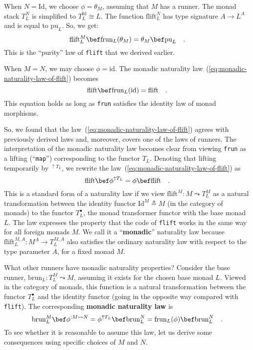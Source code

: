 When $N=\text{Id}$, we choose $\phi=\theta_{M}$, assuming that $M$
has a runner. The monad stack $T_{L}^{N}$ is simplified to $T_{L}^{\text{Id}}\cong L$.
The function $\text{flift}_{L}^{N}$ has type signature $A\rightarrow L^{A}$
and is equal to $\text{pu}_{L}$. So, we get:
\[
\text{flift}_{L}^{M}\bef\text{frun}_{L}(\theta_{M})=\theta_{M}\bef\text{pu}_{L}\quad.
\]
This is the \textsf{``}purity\textsf{''} law of \lstinline!flift! that we derived
earlier.

When $M=N$, we may choose $\phi=\text{id}$. The monadic naturality
law~(\ref{eq:monadic-naturality-law-of-flift}) becomes
\[
\text{flift}\bef\text{frun}_{L}(\text{id})=\text{flift}\quad.
\]
This equation holds as long as \lstinline!frun! satisfies the identity
law of monad morphisms.

So, we found that the law~(\ref{eq:monadic-naturality-law-of-flift})
agrees with previously derived laws and, moreover, covers one of the
laws of runners. The interpretation of the monadic naturality law
becomes clear from viewing \lstinline!frun! as a lifting (\textsf{``}\lstinline!map!\textsf{''})
corresponding to the functor $T_{L}$. Denoting that lifting temporarily
by $^{\uparrow T_{L}}$, we rewrite the law~(\ref{eq:monadic-naturality-law-of-flift})
as
\[
\text{flift}\bef\phi^{\uparrow T_{L}}=\phi\bef\text{flift}\quad.
\]
This is a standard form of a naturality law if we view $\text{flift}^{M}:M\leadsto T_{L}^{M}$
as a natural
transformation between the identity functor $\text{Id}^{M}\triangleq M$
(in the category of monads) to the functor $T_{L}^{\bullet}$, the
monad transformer functor with the base monad $L$. The law expresses
the property that the code of \lstinline!flift! works in the same
way for all foreign monads $M$. We call it a \textsf{``}\textbf{monadic}\textsf{''}
naturality law
because $\text{flift}_{L}^{M,A}:M^{A}\rightarrow T_{L}^{M,A}$ also
satisfies the ordinary naturality law with respect to the type parameter
$A$, for a fixed monad $M$.

What other runners have monadic naturality properties? Consider the
base runner, $\text{brun}_{L}:T_{L}^{M}\leadsto M$, assuming it exists
for the chosen base monad $L$. Viewed in the category of monads,
this function is a natural transformation between the functor $T_{L}^{\bullet}$
and the identity functor (going in the opposite way compared with
\lstinline!flift!). The corresponding \textbf{monadic naturality
law}
is
\[
\text{brun}_{L}^{M}\bef\phi^{:M\leadsto N}=\phi^{\uparrow T_{L}}\bef\text{brun}_{L}^{N}=\text{frun}_{L}(\phi)\bef\text{brun}_{L}^{N}\quad.
\]
To see whether it is reasonable to assume this law, let us derive
some consequences using specific choices of $M$ and $N$.

